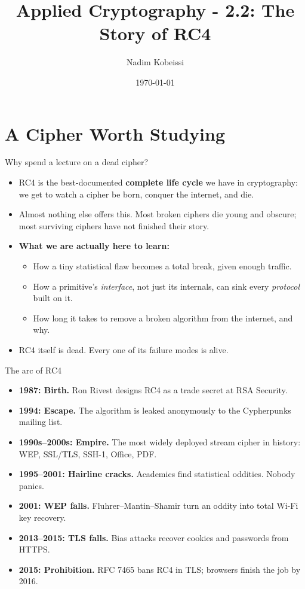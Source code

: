 \ifdefined\PRESENTATION\else\PassOptionsToClass{handout}{beamer}\fi\documentclass[aspectratio=169, lualatex]{beamer}
\title{Applied Cryptography - 2.2: The Story of RC4}
\author{Nadim Kobeissi}
\institute{Symbolic Software}
\date{\today}
\begin{document}
\begin{frame}[plain]
	\titlepage
\end{frame}

\section{A Cipher Worth Studying}

\begin{frame}{Why spend a lecture on a dead cipher?}
	\begin{itemize}[<+->]
		\item RC4 is the best-documented \textbf{complete life cycle} we have in cryptography: we get to watch a cipher be born, conquer the internet, and die.
		\item Almost nothing else offers this. Most broken ciphers die young and obscure; most surviving ciphers have not finished their story.
		\item \textbf{What we are actually here to learn:}
		      \begin{itemize}
			      \item How a tiny statistical flaw becomes a total break, given enough traffic.
			      \item How a primitive's \emph{interface}, not just its internals, can sink every \emph{protocol} built on it.
			      \item How long it takes to remove a broken algorithm from the internet, and why.
		      \end{itemize}
		\item RC4 itself is dead. Every one of its failure modes is alive.
	\end{itemize}
\end{frame}

\begin{frame}{The arc of RC4}
	\begin{itemize}[<+->]
		\item \textbf{1987: Birth.} Ron Rivest designs RC4 as a trade secret at RSA Security.
		\item \textbf{1994: Escape.} The algorithm is leaked anonymously to the Cypherpunks mailing list.
		\item \textbf{1990s--2000s: Empire.} The most widely deployed stream cipher in history: WEP, SSL/TLS, SSH-1, Office, PDF.
		\item \textbf{1995--2001: Hairline cracks.} Academics find statistical oddities. Nobody panics.
		\item \textbf{2001: WEP falls.} Fluhrer--Mantin--Shamir turn an oddity into total Wi-Fi key recovery.
		\item \textbf{2013--2015: TLS falls.} Bias attacks recover cookies and passwords from HTTPS.
		\item \textbf{2015: Prohibition.} RFC 7465 bans RC4 in TLS; browsers finish the job by 2016.
	\end{itemize}
\end{frame}
\end{document}

